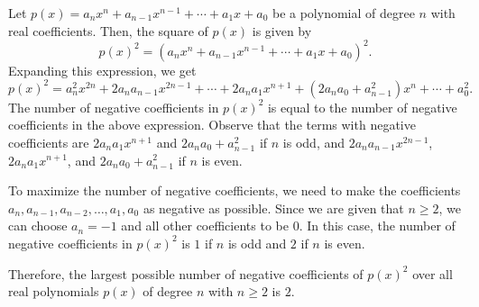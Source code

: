 Let \( p(x) = a_nx^n + a_{n-1}x^{n-1} + \cdots + a_1x + a_0 \) be a polynomial of degree \( n \) with real coefficients. Then, the square of \( p(x) \) is given by
\[ p(x)^2 = (a_nx^n + a_{n-1}x^{n-1} + \cdots + a_1x + a_0)^2. \]
Expanding this expression, we get
\[ p(x)^2 = a_n^2x^{2n} + 2a_na_{n-1}x^{2n-1} + \cdots + 2a_na_1x^{n+1} + (2a_na_0 + a_{n-1}^2)x^n + \cdots + a_0^2. \]
The number of negative coefficients in \( p(x)^2 \) is equal to the number of negative coefficients in the above expression. Observe that the terms with negative coefficients are \( 2a_na_1x^{n+1} \) and \( 2a_na_0 + a_{n-1}^2 \) if \( n \) is odd, and \( 2a_na_{n-1}x^{2n-1} \), \( 2a_na_1x^{n+1} \), and \( 2a_na_0 + a_{n-1}^2 \) if \( n \) is even.

To maximize the number of negative coefficients, we need to make the coefficients \( a_n, a_{n-1}, a_{n-2}, \ldots, a_1, a_0 \) as negative as possible. Since we are given that \( n \geq 2 \), we can choose \( a_n = -1 \) and all other coefficients to be \( 0 \). In this case, the number of negative coefficients in \( p(x)^2 \) is \( 1 \) if \( n \) is odd and \( 2 \) if \( n \) is even.

Therefore, the largest possible number of negative coefficients of \( p(x)^2 \) over all real polynomials \( p(x) \) of degree \( n \) with \( n \geq 2 \) is \( 2 \).
